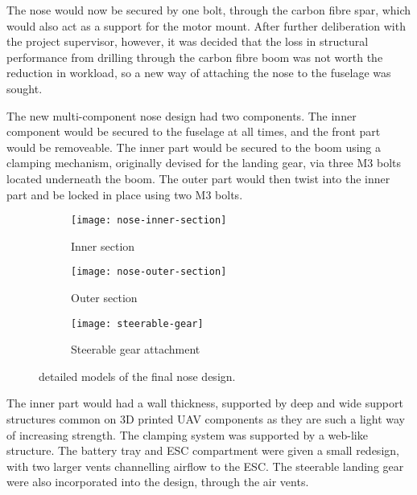 \documentclass[../../main.tex]{subfiles}
\begin{document}
The nose would now be secured by one bolt, through the carbon fibre spar, which would also act as a support for the motor mount.
After further deliberation with the project supervisor, however, it was decided that the loss in structural performance from drilling through the carbon fibre boom was not worth the reduction in workload, so a new way of attaching the nose to the fuselage was sought.  

The new multi-component nose design had two components.
The inner component would be secured to the fuselage at all times, and the front part would be removeable.
The inner part would be secured to the boom using a clamping mechanism, originally devised for the landing gear, via three M3 bolts located underneath the boom.
The outer part would then twist into the inner part and be locked in place using two M3 bolts. 

\begin{figure}[H]
    \centering
    \begin{subfigure}[b]{0.6\columnwidth}
        \centering
        \texttt{[image: nose-inner-section]}
        \caption{Inner section}
        \label{fig:nose-design:inner}
    \end{subfigure}
    
    \begin{subfigure}[b]{0.6\columnwidth}
        \centering
        \texttt{[image: nose-outer-section]}
        \caption{Outer section}
        \label{fig:nose-design:outer}
    \end{subfigure}

    \begin{subfigure}[b]{0.6\columnwidth}
        \centering
        \texttt{[image: steerable-gear]}
        \caption{Steerable gear attachment}
        \label{fig:nose-design:steerable-nose-gear}
    \end{subfigure}
    
    \caption{detailed models of the final nose design.}
    \label{fig:nose-design}
\end{figure} 


The inner part would had a  wall thickness, supported by  deep and  wide support structures common on 3D printed UAV components as they are such a light way of increasing strength.
The clamping system was supported by a web-like structure.
The battery tray and ESC compartment were given a small redesign, with two larger vents channelling airflow to the ESC.
The steerable landing gear were also incorporated into the design, through the air vents. 
\end{document}
